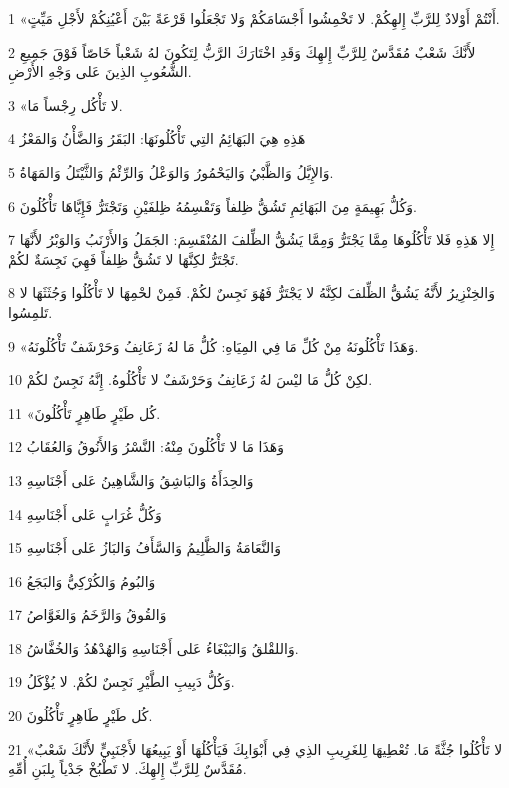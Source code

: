\par 1 «أَنْتُمْ أَوْلادٌ لِلرَّبِّ إِلهِكُمْ. لا تَخْمِشُوا أَجْسَامَكُمْ وَلا تَجْعَلُوا قَرْعَةً بَيْنَ أَعْيُنِكُمْ لأَجْلِ مَيِّتٍ.
\par 2 لأَنَّكَ شَعْبٌ مُقَدَّسٌ لِلرَّبِّ إِلهِكَ وَقَدِ اخْتَارَكَ الرَّبُّ لِتَكُونَ لهُ شَعْباً خَاصّاً فَوْقَ جَمِيعِ الشُّعُوبِ الذِينَ عَلى وَجْهِ الأَرْضِ.
\par 3 «لا تَأْكُل رِجْساً مَا.
\par 4 هَذِهِ هِيَ البَهَائِمُ التِي تَأْكُلُونَهَا: البَقَرُ وَالضَّأْنُ وَالمَعْزُ
\par 5 وَالإِيَّلُ وَالظَّبْيُ وَاليَحْمُورُ وَالوَعْلُ وَالرِّئْمُ وَالثَّيْتَلُ وَالمَهَاةُ.
\par 6 وَكُلُّ بَهِيمَةٍ مِنَ البَهَائِمِ تَشُقُّ ظِلفاً وَتَقْسِمُهُ ظِلفَيْنِ وَتَجْتَرُّ فَإِيَّاهَا تَأْكُلُونَ.
\par 7 إِلا هَذِهِ فَلا تَأْكُلُوهَا مِمَّا يَجْتَرُّ وَمِمَّا يَشُقُّ الظِّلفَ المُنْقَسِمَ: الجَمَلُ وَالأَرْنَبُ وَالوَبْرُ لأَنَّهَا تَجْتَرُّ لكِنَّهَا لا تَشُقُّ ظِلفاً فَهِيَ نَجِسَةٌ لكُمْ.
\par 8 وَالخِنْزِيرُ لأَنَّهُ يَشُقُّ الظِّلفَ لكِنَّهُ لا يَجْتَرُّ فَهُوَ نَجِسٌ لكُمْ. فَمِنْ لحْمِهَا لا تَأْكُلُوا وَجُثَثَهَا لا تَلمِسُوا.
\par 9 «وَهَذَا تَأْكُلُونَهُ مِنْ كُلِّ مَا فِي المِيَاهِ: كُلُّ مَا لهُ زَعَانِفُ وَحَرْشَفٌ تَأْكُلُونَهُ.
\par 10 لكِنْ كُلُّ مَا ليْسَ لهُ زَعَانِفُ وَحَرْشَفٌ لا تَأْكُلُوهُ. إِنَّهُ نَجِسٌ لكُمْ.
\par 11 «كُل طَيْرٍ طَاهِرٍ تَأْكُلُونَ.
\par 12 وَهَذَا مَا لا تَأْكُلُونَ مِنْهُ: النَّسْرُ وَالأَنُوقُ وَالعُقَابُ
\par 13 وَالحِدَأَةُ وَالبَاشِقُ وَالشَّاهِينُ عَلى أَجْنَاسِهِ
\par 14 وَكُلُّ غُرَابٍ عَلى أَجْنَاسِهِ
\par 15 وَالنَّعَامَةُ وَالظَّلِيمُ وَالسَّأَفُ وَالبَازُ عَلى أَجْنَاسِهِ
\par 16 وَالبُومُ وَالكُرْكِيُّ وَالبَجَعُ
\par 17 وَالقُوقُ وَالرَّخَمُ وَالغَوَّاصُ
\par 18 وَاللقْلقُ وَالبَبْغَاءُ عَلى أَجْنَاسِهِ وَالهُدْهُدُ وَالخُفَّاشُ.
\par 19 وَكُلُّ دَبِيبِ الطَّيْرِ نَجِسٌ لكُمْ. لا يُؤْكَلُ.
\par 20 كُل طَيْرٍ طَاهِرٍ تَأْكُلُونَ.
\par 21 «لا تَأْكُلُوا جُثَّةً مَا. تُعْطِيهَا لِلغَرِيبِ الذِي فِي أَبْوَابِكَ فَيَأْكُلُهَا أَوْ يَبِيعُهَا لأَجْنَبِيٍّ لأَنَّكَ شَعْبٌ مُقَدَّسٌ لِلرَّبِّ إِلهِكَ. لا تَطْبُخْ جَدْياً بِلبَنِ أُمِّهِ.
